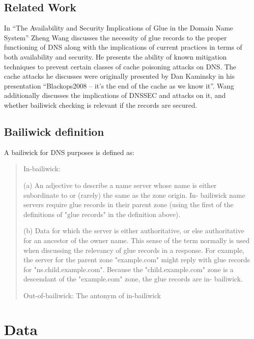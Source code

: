 \documentclass{idc_msc}
\begin{document}
\subsection{Related Work}
In “The Availability and Security Implications of Glue in the Domain Name System” \cite{2016arXiv160501394W} Zheng Wang discusses the necessity of glue records to the proper functioning of DNS along with the implications of current practices in terms of both availability and security. He presents the ability of known mitigation techniques to prevent certain classes of cache poisoning attacks on DNS.
The cache attacks he discusses were originally presented by Dan Kaminsky in his presentation “Blackops2008 – it's the end of the cache as we know it”.
Wang additionally discusses the implications of DNSSEC and attacks on it, and whether bailiwick checking is relevant if the records are secured.

\subsection{Bailiwick definition}

A bailiwick for DNS purposes is defined\cite{rfc7719} as:

\begin{quote}
In-bailiwick:

      (a) An adjective to describe a name server whose name is either
      subordinate to or (rarely) the same as the zone origin.  In-
      bailiwick name servers require glue records in their parent zone
      (using the first of the definitions of "glue records" in the
      definition above).

      (b) Data for which the server is either authoritative, or else
      authoritative for an ancestor of the owner name.  This sense of
      the term normally is used when discussing the relevancy of glue
      records in a response.  For example, the server for the parent
      zone "example.com" might reply with glue records for
      "ns.child.example.com".  Because the "child.example.com" zone is a
      descendant of the "example.com" zone, the glue records are in-
      bailiwick.

   Out-of-bailiwick:  The antonym of in-bailiwick
\end{quote}

\section{Data}
\end{document}
